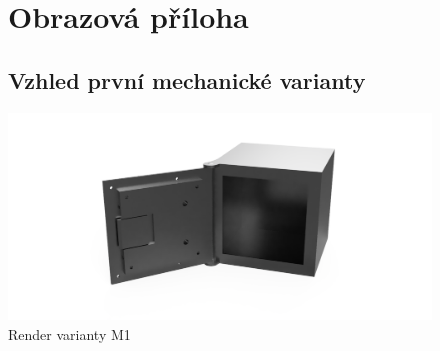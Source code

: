 \newcommand{\OdsazeniNadpisu}{10mm}
\begin{figure}

	

    \chapter{Obrazová příloha}
    \section{Vzhled první mechanické varianty}
	\centering
	\includegraphics[width=\textwidth]{kapitoly/obrazky/M1/render.png}
	\caption{Render varianty M1}
	\label{fig:E3-renderi}
\end{figure}

